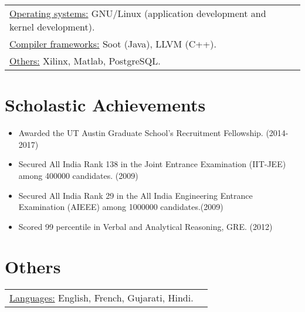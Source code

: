 \documentclass[margin]{res}
\begin{document}
\begin{resume}
\begin{tabular}{l p{3in}}
    \underline{Operating systems:} GNU/Linux (application development
    and kernel development). \\

    \underline{Compiler frameworks:} Soot (Java), LLVM (C++). \\

    \underline{Others:} Xilinx, Matlab, PostgreSQL. \\
 \end{tabular}

\section{Scholastic Achievements}
 \begin{itemize} \itemsep -2pt  %
 \item Awarded the UT Austin Graduate School's Recruitment
   Fellowship. \hfill (2014-2017)
 \item Secured All India Rank 138 in the Joint Entrance Examination
   (IIT-JEE) among 400000 candidates. \hfill (2009)
 \item Secured All India Rank 29 in the All India Engineering Entrance
   Examination (AIEEE) among 1000000 candidates.\hfill (2009)
 \item Scored 99 percentile in Verbal and Analytical Reasoning,
   GRE. \hfill (2012)
 \end{itemize}

\section{Others}
\begin{tabular}{l p{3in}}
  \underline{Languages:} English, French, Gujarati, Hindi. \\
\end{tabular}

\end{resume} 
\end{document}
